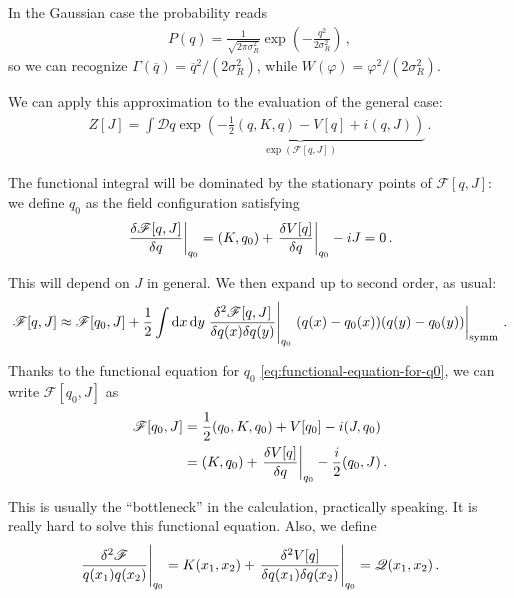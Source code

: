 \documentclass[main.tex]{subfiles}
\begin{document}
In the Gaussian case the probability reads 
%
\begin{align}
P(q) = \frac{1}{\sqrt{2 \pi \sigma _R^2}} \exp(- \frac{q^2}{2 \sigma _R^2})
\,,
\end{align}
%
so we can recognize \(\Gamma (\overline{q}) = \overline{q}^2 / (2 \sigma _R^2)\), while \(W (\varphi ) = \varphi^2 / (2 \sigma _R^2)\). 

We can apply this approximation to the evaluation of the general case: 
%
\begin{align}
Z[J] = \int \mathcal{D}q \underbrace{\exp(- \frac{1}{2} (q, K, q) - V[q] + i (q, J))}_{\exp(\mathscr{F}[q, J])}
\,.
\end{align}

The functional integral will be dominated by the stationary points of \(\mathscr{F}[q, J]\): we define \(q_0 \) as the field configuration satisfying
%
\begin{align} \label{eq:functional-equation-for-q0}
\eval{\fdv{\mathscr{F}[q, J]}{q}}_{q_0 } = (K, q_0 ) + \eval{\fdv{V[q]}{q}}_{q_0 } - iJ = 0
\,.
\end{align}

This will depend on \(J\) in general. We then expand up to second order, as usual: 
%
\begin{align}
\mathscr{F}[q, J] \approx \mathscr{F}[q_0 , J] + \frac{1}{2} \int \dd{x} \dd{y} \eval{\frac{ \delta^2 \mathscr{F}[q, J]}{ \delta q(x) \delta q(y) }}_{q_0 } \eval{(q(x) - q_0 (x)) (q(y) - q_0 (y))}_{\text{symm}}
\,.
\end{align}

Thanks to the functional equation for \(q_0 \) \eqref{eq:functional-equation-for-q0}, we can write \(\mathscr{F}[q_0 , J]\) as 
%
\begin{align}
\mathscr{F}[q_0 , J] &= \frac{1}{2} (q_0 , K, q_0 ) + V[q_0 ] - i (J, q_0 )  \\
&= (K, q_0 ) + \eval{\fdv{V[q]}{q}}_{q_0 } - \frac{i}{2}  (q_0, J) 
\,.
\end{align}
%

This is usually the ``bottleneck'' in the calculation, practically speaking. It is really hard to solve this functional equation.
Also, we define
%
\begin{align}
\eval{\frac{ \delta^2 \mathscr{F}}{q(x_1 ) q(x_2 )}}_{q_0 }
= K(x_1 , x_2 ) + \eval{\frac{ \delta^2 V[q]}{ \delta q(x_1 ) \delta q(x_2 )}}_{q_0 } = \mathscr{Q}(x_1 , x_2 )
\,.
\end{align}
\end{document}
